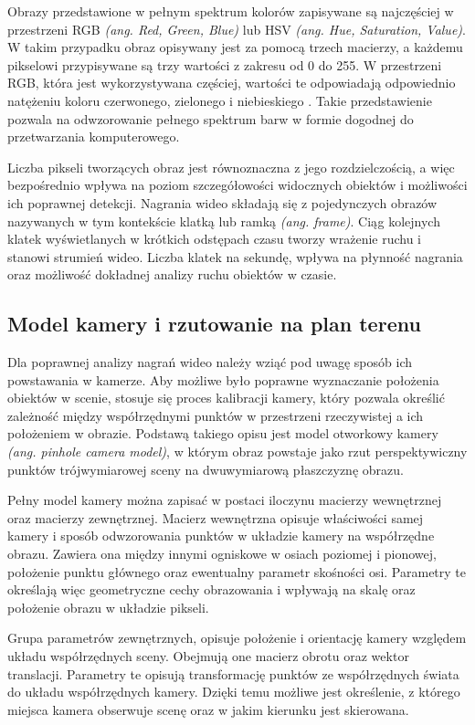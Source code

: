 Obrazy przedstawione w pełnym spektrum kolorów zapisywane są najczęściej w przestrzeni RGB
\textit{(ang. Red, Green, Blue)} lub HSV \textit{(ang. Hue, Saturation, Value)}. W takim przypadku
obraz opisywany jest za pomocą trzech macierzy, a każdemu pikselowi przypisywane są trzy wartości z
zakresu od 0 do 255. W przestrzeni RGB, która jest wykorzystywana częściej, wartości te odpowiadają
odpowiednio natężeniu koloru czerwonego, zielonego i niebieskiego \cite{gonzalezwoods}. Takie
przedstawienie pozwala na odwzorowanie pełnego spektrum barw w formie dogodnej do przetwarzania
komputerowego.

Liczba pikseli tworzących obraz jest równoznaczna z jego rozdzielczością\cite{gonzalezwoods}, a
więc bezpośrednio wpływa na poziom szczegółowości widocznych obiektów i możliwości ich poprawnej
detekcji. Nagrania wideo składają się z pojedynczych obrazów nazywanych w tym kontekście klatką lub
ramką \textit{(ang. frame)}. Ciąg kolejnych klatek wyświetlanych w krótkich odstępach czasu tworzy
wrażenie ruchu i stanowi strumień wideo. Liczba klatek na sekundę, wpływa na płynność nagrania oraz
możliwość dokładnej analizy ruchu obiektów w czasie.

\subsection{Model kamery i rzutowanie na plan terenu}
Dla poprawnej analizy nagrań wideo należy wziąć pod uwagę sposób ich powstawania w kamerze. Aby
możliwe było poprawne wyznaczanie położenia obiektów w scenie, stosuje się proces kalibracji
kamery, który pozwala określić zależność między współrzędnymi punktów w przestrzeni rzeczywistej a
ich położeniem w obrazie. Podstawą takiego opisu jest model otworkowy kamery \textit{(ang. pinhole
  camera model)}, w którym obraz powstaje jako rzut perspektywiczny punktów trójwymiarowej sceny na
dwuwymiarową płaszczyznę obrazu\cite{hartleyzisserman}.

Pełny model kamery można zapisać w postaci iloczynu macierzy wewnętrznej oraz macierzy zewnętrznej.
Macierz wewnętrzna opisuje właściwości samej kamery i sposób odwzorowania punktów w układzie kamery
na współrzędne obrazu. Zawiera ona między innymi ogniskowe w osiach poziomej i pionowej, położenie
punktu głównego oraz ewentualny parametr skośności osi. Parametry te określają więc geometryczne
cechy obrazowania i wpływają na skalę oraz położenie obrazu w układzie pikseli\cite{szeliski2022}.

Grupa parametrów zewnętrznych, opisuje położenie i orientację kamery względem układu współrzędnych
sceny. Obejmują one macierz obrotu oraz wektor translacji. Parametry te opisują transformację
punktów ze współrzędnych świata do układu współrzędnych kamery. Dzięki temu możliwe jest
określenie, z którego miejsca kamera obserwuje scenę oraz w jakim kierunku jest
skierowana\cite{szeliski2022}.


